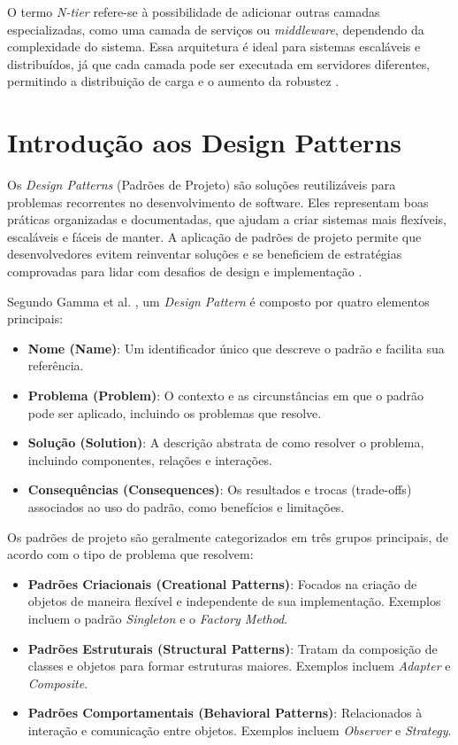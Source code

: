 O termo \textit{N-tier} refere-se à possibilidade de adicionar outras camadas especializadas, como uma camada de serviços ou \textit{middleware}, dependendo da complexidade do sistema. Essa arquitetura é ideal para sistemas escaláveis e distribuídos, já que cada camada pode ser executada em servidores diferentes, permitindo a distribuição de carga e o aumento da robustez \cite{bass2003}.

\section{Introdução aos Design Patterns}

Os \textit{Design Patterns} (Padrões de Projeto) são soluções reutilizáveis para problemas recorrentes no desenvolvimento de software. Eles representam boas práticas organizadas e documentadas, que ajudam a criar sistemas mais flexíveis, escaláveis e fáceis de manter. A aplicação de padrões de projeto permite que desenvolvedores evitem reinventar soluções e se beneficiem de estratégias comprovadas para lidar com desafios de design e implementação \cite{gamma1994}.

Segundo Gamma et al. \cite{gamma1994}, um \textit{Design Pattern} é composto por quatro elementos principais:

\begin{itemize}
    \item \textbf{Nome (Name)}: Um identificador único que descreve o padrão e facilita sua referência.
    \item \textbf{Problema (Problem)}: O contexto e as circunstâncias em que o padrão pode ser aplicado, incluindo os problemas que resolve.
    \item \textbf{Solução (Solution)}: A descrição abstrata de como resolver o problema, incluindo componentes, relações e interações.
    \item \textbf{Consequências (Consequences)}: Os resultados e trocas (trade-offs) associados ao uso do padrão, como benefícios e limitações.
\end{itemize}

Os padrões de projeto são geralmente categorizados em três grupos principais, de acordo com o tipo de problema que resolvem:

\begin{itemize}
    \item \textbf{Padrões Criacionais (Creational Patterns)}: Focados na criação de objetos de maneira flexível e independente de sua implementação. Exemplos incluem o padrão \textit{Singleton} e o \textit{Factory Method}.
    \item \textbf{Padrões Estruturais (Structural Patterns)}: Tratam da composição de classes e objetos para formar estruturas maiores. Exemplos incluem \textit{Adapter} e \textit{Composite}.
    \item \textbf{Padrões Comportamentais (Behavioral Patterns)}: Relacionados à interação e comunicação entre objetos. Exemplos incluem \textit{Observer} e \textit{Strategy}.
\end{itemize}

